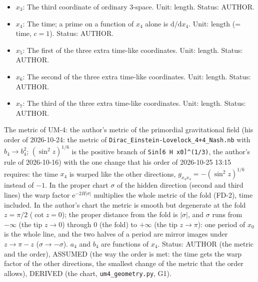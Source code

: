 \documentclass[
  10pt,
]{article}
\begin{document}
\begin{itemize}
  Status: AUTHOR.
\item
  \(x_3\): The third coordinate of ordinary 3-space. Unit: length.
  Status: AUTHOR.
\item
  \(x_4\): The time; a prime on a function of \(x_4\) alone is
  \(\mathrm{d}/\mathrm{d}x_4\). Unit: length (= time, \(c = 1\)).
  Status: AUTHOR.
\item
  \(x_5\): The first of the three extra time-like coordinates. Unit:
  length. Status: AUTHOR.
\item
  \(x_6\): The second of the three extra time-like coordinates. Unit:
  length. Status: AUTHOR.
\item
  \(x_7\): The third of the three extra time-like coordinates. Unit:
  length. Status: AUTHOR.
\end{itemize}

The metric of UM-4: the author's metric of the primordial gravitational
field (his order of 2026-10-24: the metric of
\texttt{Dirac\_Einstein-Lovelock\_4+4\_Nash.nb} with \(b_4 \to b_4^2\);
\((\sin^2z)^{1/6}\) is the positive branch of
\texttt{Sin{[}6\ H\ x0{]}\^{}(1/3)}, the author's rule of 2026-10-16)
with the one change that his order of 2026-10-25 13:15 requires: the
time \(x_4\) is warped like the other directions,
\(g_{x_4x_4} = -(\sin^2z)^{1/6}\) instead of \(-1\). In the proper chart
\(\sigma\) of the hidden direction (second and third lines) the warp
factor \(\mathrm{e}^{-2H\lvert\sigma\rvert}\) multiplies the whole
metric of the fold (FD-2), time included. In the author's chart the
metric is smooth but degenerate at the fold \(z = \pi/2\)
(\(\cot z = 0\)); the proper distance from the fold is
\(\lvert\sigma\rvert\), and \(\sigma\) runs from \(-\infty\) (the tip
\(z \to 0\)) through \(0\) (the fold) to \(+\infty\) (the tip
\(z \to \pi\)): one period of \(x_0\) is the whole line, and the two
halves of a period are mirror images under \(z \to \pi - z\)
(\(\sigma \to -\sigma\)). \(a_4\) and \(b_4\) are functions of \(x_4\).
Status: AUTHOR (the metric and the order), ASSUMED (the way the order is
met: the time gets the warp factor of the other directions, the smallest
change of the metric that the order allows), DERIVED (the chart,
\texttt{um4\_geometry.py}, G1).
\end{document}
